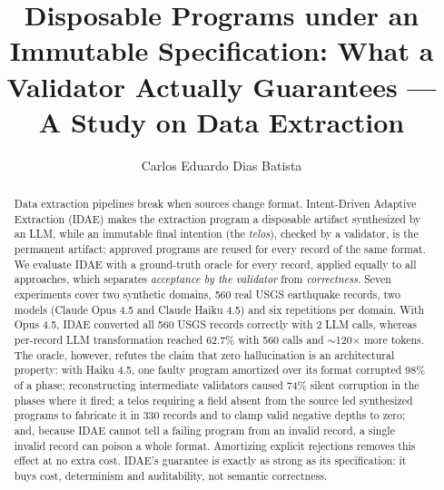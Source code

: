 \documentclass[sigconf,nonacm]{acmart}
\begin{document}
\title[Disposable Programs under an Immutable Specification]{Disposable Programs under an Immutable Specification: What a Validator Actually Guarantees --- A Study on Data Extraction}

\author{Carlos Eduardo Dias Batista}

\renewcommand{\shortauthors}{Batista}

\begin{abstract}
Data extraction pipelines break when sources change format. Intent-Driven Adaptive Extraction (IDAE) makes the extraction program a disposable artifact synthesized by an LLM, while an immutable final intention (the \textit{telos}), checked by a validator, is the permanent artifact; approved programs are reused for every record of the same format. We evaluate IDAE with a ground-truth oracle for every record, applied equally to all approaches, which separates \textit{acceptance by the validator} from \textit{correctness}. Seven experiments cover two synthetic domains, 560 real USGS earthquake records, two models (Claude Opus 4.5 and Claude Haiku 4.5) and six repetitions per domain. With Opus 4.5, IDAE converted all 560 USGS records correctly with 2 LLM calls, whereas per-record LLM transformation reached 62.7\% with 560 calls and $\sim$120$\times$ more tokens. The oracle, however, refutes the claim that zero hallucination is an architectural property: with Haiku 4.5, one faulty program amortized over its format corrupted 98\% of a phase; reconstructing intermediate validators caused 74\% silent corruption in the phases where it fired; a telos requiring a field absent from the source led synthesized programs to fabricate it in 330 records and to clamp valid negative depths to zero; and, because IDAE cannot tell a failing program from an invalid record, a single invalid record can poison a whole format. Amortizing explicit rejections removes this effect at no extra cost. IDAE's guarantee is exactly as strong as its specification: it buys cost, determinism and auditability, not semantic correctness.
\end{abstract}


\frenchspacing
\maketitle
\end{document}
